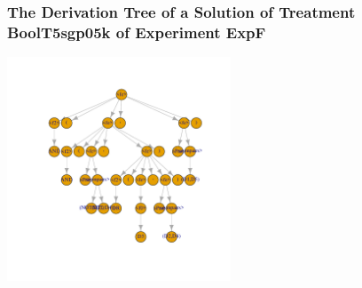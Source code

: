  \begin{frame}
 \frametitle{ The Derivation Tree of a Solution of Treatment BoolT5sgp05k of Experiment ExpF }
 \begin{center}
\includegraphics[width=0.5\textwidth, angle=0]
{ExpFDerivationTreeFigure003.pdf}
 \end{center}
 \label{report/ExpFDerivationTreeFigure003.pdf}  
 \end{frame}

